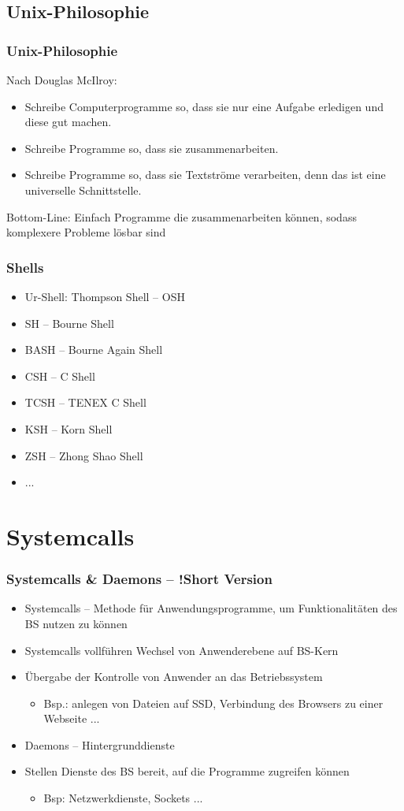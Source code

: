 \documentclass[xcolor=dvipsnames,aspectratio=169]{beamer}
\begin{document}
\subsection{Unix-Philosophie}
\begin{frame}
	\frametitle{Unix-Philosophie}
	Nach Douglas McIlroy:
	\begin{itemize}
		\item Schreibe Computerprogramme so, dass sie nur eine Aufgabe erledigen und diese gut machen.
		\item Schreibe Programme so, dass sie zusammenarbeiten.
		\item Schreibe Programme so, dass sie Textströme verarbeiten, denn das ist eine universelle Schnittstelle.
	\end{itemize}
	Bottom-Line: Einfach Programme die zusammenarbeiten können, sodass komplexere Probleme lösbar sind
\end{frame}

\begin{frame}
	\frametitle{Shells}
	\begin{itemize}
		\item Ur-Shell: Thompson Shell -- OSH
		\item SH -- Bourne Shell 
		\item BASH -- Bourne Again Shell
		\item CSH -- C Shell
		\item TCSH -- TENEX C Shell
		\item KSH -- Korn Shell
		\item ZSH -- Zhong Shao Shell
		\item ...
	\end{itemize}
\end{frame}

\section{Systemcalls}
\begin{frame}
	\frametitle{Systemcalls \& Daemons -- !Short Version}
	\begin{itemize}
		\item Systemcalls -- Methode für Anwendungsprogramme, um Funktionalitäten des BS nutzen zu können
		\item Systemcalls vollführen Wechsel von Anwenderebene auf BS-Kern 
		\item Übergabe der Kontrolle von Anwender an das Betriebssystem
		\begin{itemize}
			\item Bsp.: anlegen von Dateien auf SSD, Verbindung des Browsers zu einer Webseite ...
		\end{itemize}
		\item Daemons -- Hintergrunddienste
		\item Stellen Dienste des BS bereit, auf die Programme zugreifen können
		\begin{itemize}
			\item Bsp: Netzwerkdienste, Sockets ...
		\end{itemize} 
	\end{itemize}
\end{frame}
\end{document}

